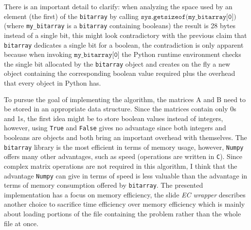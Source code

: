 \documentclass{beamer}
\begin{document}
\begin{frame}
    There is an important detail to clarify:
    when analyzing the space used by an element (the first) of the 
    \texttt{bitarray} by calling $\texttt{sys.getsizeof(my\_bitarray[0])}$ (where
    \texttt{my\_bitarray} is a \texttt{bitarray} containing booleans) the result is 28 bytes instead of a single bit, 
    this might look contradictory with the previous claim that \texttt{bitarray} dedicates a single
    bit for a boolean, the contradiction is only apparent because when invoking $\texttt{my\_bitarray[0]}$ 
    the Python runtime environment checks the single bit allocated by the \texttt{bitarray} object and
    creates on the fly a new object containing the corresponding boolean value required plus the overhead
    that every object in Python has.
\end{frame}

\begin{frame}{}
    To pursue the goal of implementing the algorithm, the matrices A and B need
    to be stored in an appropriate data structure. Since the matrices contain
    only 0s and 1s, the first idea might be to store boolean values instead
    of integers, however, using 
    \texttt{True} and \texttt{False} gives no advantage since both integers and
    booleans are objects and both bring an important overhead with themselves.
    The \texttt{bitarray} library is the most efficient in  terms of memory usage,
    however, \texttt{Numpy} offers many other advantages, such as speed (operations
    are written in \texttt{C}).
    Since complex matrix operations are not required in this algorithm, I think
    that the advantage \texttt{Numpy} can give in terms of speed is less valuable
    than the advantage in terms of memory consumption offered by \texttt{bitarray}.
    The presented implementation has a focus on memory efficiency, the slide \textit{EC wrapper} describes
    another choice to sacrifice time efficiency over memory efficiency which is mainly about
    loading portions of the file containing the problem rather than the whole file at once.
\end{frame}
\end{document}
